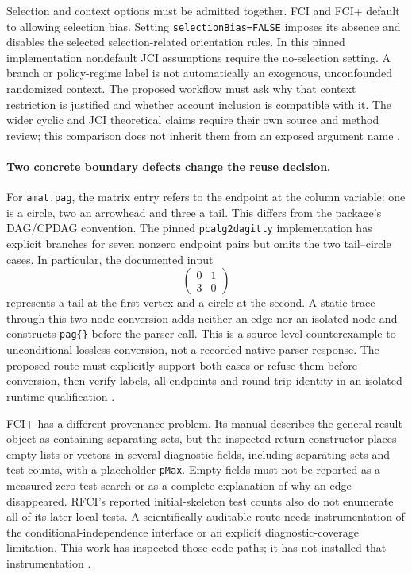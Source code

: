 Selection and context options must be admitted together. FCI and FCI+
default to allowing selection bias. Setting \texttt{selectionBias=FALSE}
imposes its absence and disables the selected selection-related orientation
rules. In this pinned implementation nondefault JCI assumptions require the
no-selection setting. A branch or policy-regime label is not automatically
an exogenous, unconfounded randomized context. The proposed workflow must
ask why that context restriction is justified and whether account inclusion
is compatible with it. The wider cyclic and JCI theoretical claims require
their own source and method review; this comparison does not inherit them
from an exposed argument name
\citep{exec13_latentr_primary}.

\paragraph{Two concrete boundary defects change the reuse decision.}
For \texttt{amat.pag}, the matrix entry refers to the endpoint at the
column variable: one is a circle, two an arrowhead and three a tail. This
differs from the package's DAG/CPDAG convention. The pinned
\texttt{pcalg2dagitty} implementation has explicit branches for seven
nonzero endpoint pairs but omits the two tail--circle cases. In particular,
the documented input
\[
 \begin{pmatrix}0&1\\3&0\end{pmatrix}
\]
represents a tail at the first vertex and a circle at the second. A static
trace through this two-node conversion adds neither an edge nor an isolated
node and constructs \texttt{pag\{\}} before the parser call. This is a
source-level counterexample to unconditional lossless conversion, not a
recorded native parser response. The proposed route must explicitly support
both cases or refuse them before conversion, then verify labels, all endpoints
and round-trip identity in an isolated runtime qualification
\citep{exec13_latentr_primary,exec13_latentr_exact}.

FCI+ has a different provenance problem. Its manual describes the general
result object as containing separating sets, but the inspected return
constructor places empty lists or vectors in several diagnostic fields,
including separating sets and test counts, with a placeholder
\texttt{pMax}. Empty fields must not be reported as a measured zero-test
search or as a complete explanation of why an edge disappeared. RFCI's
reported initial-skeleton test counts also do not enumerate all of its
later local tests. A scientifically auditable route needs instrumentation
of the conditional-independence interface or an explicit diagnostic-coverage
limitation. This work has inspected those code paths; it has not installed
that instrumentation
\citep{exec13_latentr_primary}.


